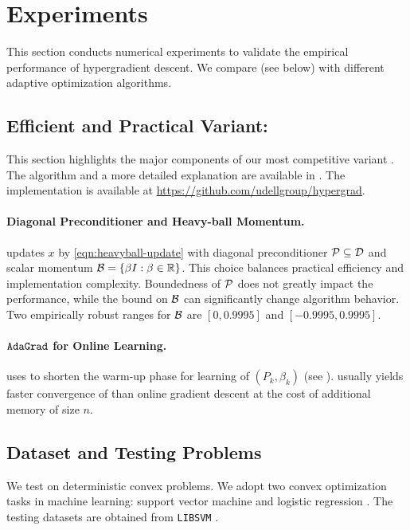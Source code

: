 \section{Experiments} \label{sec:exp}

This section conducts numerical experiments to validate the empirical
performance of hypergradient descent. We compare {\hdmbest} (see  below) with 
different adaptive optimization algorithms.

\subsection{Efficient and Practical Variant: {\hdmbest}} \label{sec:hdmbest}

This section highlights the major components of our most competitive variant {\hdmbest}. The algorithm and a more detailed explanation are available in . The implementation is available at \url{https://github.com/udellgroup/hypergrad}. 

\paragraph{Diagonal Preconditioner and Heavy-ball Momentum.} {\hdmbest} updates $x$ by \eqref{eqn:heavyball-update} with diagonal preconditioner \cite{qu2024optimal,gao2023scalable} $\mathcal{P} \subseteq \mathcal{D}$ and scalar momentum $\mathcal{B} = \{ \beta I : \beta \in \mathbb{R} \}$.
This choice balances practical efficiency and implementation complexity. Boundedness of $\mathcal{P}$ does not greatly impact the performance, while the bound on $\mathcal{B}$ can significantly change algorithm behavior. Two empirically robust ranges for $\mathcal{B}$ are $[0,0.9995]$ and $[-0.9995,0.9995]$. 

\paragraph{${\texttt{AdaGrad}}$ for Online Learning. } {\hdmbest} uses {\adagrad} to shorten the warm-up phase for learning of $(P_k, \beta_k)$ (see ). {\adagrad} usually yields faster convergence of {\hdm} than online gradient descent at the cost of additional memory of size $n$.

\subsection{Dataset and Testing Problems}
We test {\hdmbest} on deterministic convex problems. We adopt two convex optimization tasks in machine learning: support vector machine \cite{lee2001ssvm} and logistic regression \cite{hastie2009elements}. The testing datasets are obtained from \texttt{LIBSVM} \cite{chang2011libsvm}.


